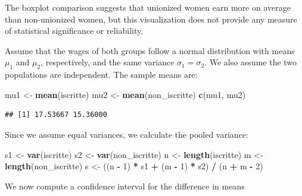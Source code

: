 \documentclass[
]{article}
\newenvironment{Shaded}{\begin{snugshade}}{\end{snugshade}}
\newcommand{\DecValTok}[1]{\textcolor[rgb]{0.00,0.00,0.81}{#1}}
\newcommand{\FunctionTok}[1]{\textcolor[rgb]{0.13,0.29,0.53}{\textbf{#1}}}
\newcommand{\NormalTok}[1]{#1}
\newcommand{\OtherTok}[1]{\textcolor[rgb]{0.56,0.35,0.01}{#1}}
\newcommand{\SpecialCharTok}[1]{\textcolor[rgb]{0.81,0.36,0.00}{\textbf{#1}}}
\begin{document}
The boxplot comparison suggests that unionized women earn more on
average than non-unionized women, but this visualization does not
provide any measure of statistical significance or reliability.

Assume that the wages of both groups follow a normal distribution with
means \(\mu_1\) and \(\mu_2\), respectively, and the same variance
\(\sigma_1 = \sigma_2\). We also assume the two populations are
independent. The sample means are:

\begin{Shaded}
\begin{Highlighting}[]
\NormalTok{mu1 }\OtherTok{\textless{}{-}} \FunctionTok{mean}\NormalTok{(iscritte)}
\NormalTok{mu2 }\OtherTok{\textless{}{-}} \FunctionTok{mean}\NormalTok{(non\_iscritte)}
\FunctionTok{c}\NormalTok{(mu1, mu2)}
\end{Highlighting}
\end{Shaded}

\begin{verbatim}
## [1] 17.53667 15.36000
\end{verbatim}

Since we assume equal variances, we calculate the pooled variance:

\begin{Shaded}
\begin{Highlighting}[]
\NormalTok{s1 }\OtherTok{\textless{}{-}} \FunctionTok{var}\NormalTok{(iscritte)}
\NormalTok{s2 }\OtherTok{\textless{}{-}} \FunctionTok{var}\NormalTok{(non\_iscritte)}
\NormalTok{n }\OtherTok{\textless{}{-}} \FunctionTok{length}\NormalTok{(iscritte)}
\NormalTok{m }\OtherTok{\textless{}{-}} \FunctionTok{length}\NormalTok{(non\_iscritte)}
\NormalTok{s }\OtherTok{\textless{}{-}}\NormalTok{ ((n }\SpecialCharTok{{-}} \DecValTok{1}\NormalTok{) }\SpecialCharTok{*}\NormalTok{ s1 }\SpecialCharTok{+}\NormalTok{ (m }\SpecialCharTok{{-}} \DecValTok{1}\NormalTok{) }\SpecialCharTok{*}\NormalTok{ s2) }\SpecialCharTok{/}\NormalTok{ (n }\SpecialCharTok{+}\NormalTok{ m }\SpecialCharTok{{-}} \DecValTok{2}\NormalTok{)}
\end{Highlighting}
\end{Shaded}

We now compute a confidence interval for the difference in means
\end{document}
